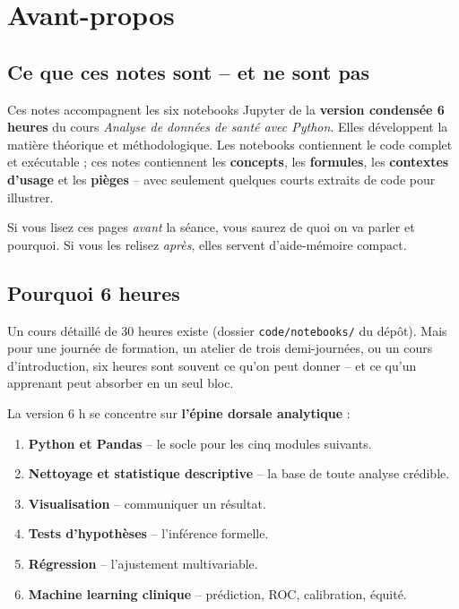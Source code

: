 \documentclass[11pt,a4paper]{article}
\begin{document}

\tableofcontents
\thispagestyle{empty}

\newpage


\section*{Avant-propos}

\subsection*{Ce que ces notes sont -- et ne sont pas}

Ces notes accompagnent les six notebooks Jupyter de la \textbf{version
condens\'ee 6 heures} du cours \emph{Analyse de donn\'ees de sant\'e
avec Python}. Elles d\'eveloppent la mati\`ere th\'eorique et
m\'ethodologique. Les notebooks contiennent le code complet et
ex\'ecutable ; ces notes contiennent les \textbf{concepts}, les
\textbf{formules}, les \textbf{contextes d'usage} et les
\textbf{pi\`eges} -- avec seulement quelques courts extraits de code
pour illustrer.

Si vous lisez ces pages \emph{avant} la s\'eance, vous saurez de quoi
on va parler et pourquoi. Si vous les relisez \emph{apr\`es}, elles
servent d'aide-m\'emoire compact.

\subsection*{Pourquoi 6 heures}

Un cours d\'etaill\'e de 30 heures existe (dossier \texttt{code/notebooks/}
du d\'ep\^ot). Mais pour une journ\'ee de formation, un atelier de trois
demi-journ\'ees, ou un cours d'introduction, six heures sont souvent ce
qu'on peut donner -- et ce qu'un apprenant peut absorber en un seul bloc.

La version 6 h se concentre sur \textbf{l'\'epine dorsale analytique} :

\begin{enumerate}
  \item \textbf{Python et Pandas} -- le socle pour les cinq modules suivants.
  \item \textbf{Nettoyage et statistique descriptive} -- la base de toute
        analyse cr\'edible.
  \item \textbf{Visualisation} -- communiquer un r\'esultat.
  \item \textbf{Tests d'hypoth\`eses} -- l'inf\'erence formelle.
  \item \textbf{R\'egression} -- l'ajustement multivariable.
  \item \textbf{Machine learning clinique} -- pr\'ediction, ROC, calibration,
        \'equit\'e.
\end{enumerate}
\end{document}
